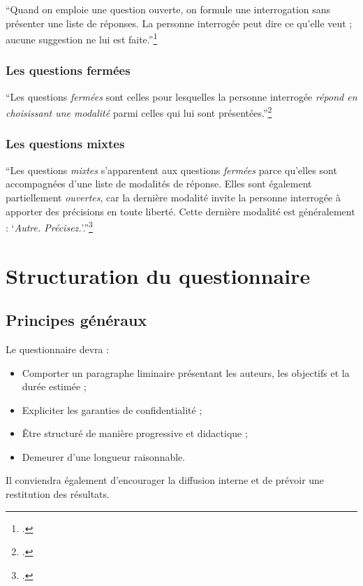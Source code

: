 \documentclass[12pt,a4paper]{article}
\begin{document}
\enquote{Quand on emploie une question ouverte, on formule une interrogation sans présenter une liste de réponses. La personne interrogée peut dire ce qu'elle veut ; aucune suggestion ne lui est faite.}\footcite[65]{Fenneteau2015}

\subsubsection{Les questions fermées}

\enquote{Les questions \textit{fermées} sont celles pour lesquelles la personne interrogée
\textit{répond en choisissant une modalité} parmi celles qui lui sont
présentées.}\footcite[71]{Fenneteau2015}

\subsubsection{Les questions mixtes}

\enquote{Les questions \textit{mixtes} s'apparentent aux questions \textit{fermées} parce
qu'elles sont accompagnées d'une liste de modalités de réponse. Elles
sont également partiellement \textit{ouvertes}, car la dernière modalité invite
la personne interrogée à apporter des précisions en toute liberté.
Cette dernière modalité est généralement : \enquote{\textit{Autre. Précisez.}}.}\footcite[79]{Fenneteau2015}

\newpage
\section{Structuration du questionnaire}

\subsection{Principes généraux}

Le questionnaire devra :

\begin{itemize}
    \item Comporter un paragraphe liminaire présentant les auteurs, les objectifs et la durée estimée ;
    \item Expliciter les garanties de confidentialité ;
    \item Être structuré de manière progressive et didactique ;
    \item Demeurer d'une longueur raisonnable.
\end{itemize}

Il conviendra également d'encourager la diffusion interne et de prévoir une restitution des résultats.
\end{document}
